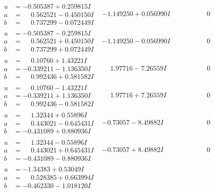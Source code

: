 \documentclass[1p]{elsarticle_modified}
\theoremstyle{definition}
\begin{document}
$$\begin{array}{c|c|c}
\begin{aligned}
u &= -0.505387 + 0.259815 I \\
a &= \phantom{-}0.562521 - 0.450150 I \\
b &= \phantom{-}0.737299 - 0.072449 I\end{aligned}
 & -1.149250 + 0.056990 I & \phantom{-0.000000 } 0 \\ \hline\begin{aligned}
u &= -0.505387 - 0.259815 I \\
a &= \phantom{-}0.562521 + 0.450150 I \\
b &= \phantom{-}0.737299 + 0.072449 I\end{aligned}
 & -1.149250 - 0.056990 I & \phantom{-0.000000 } 0 \\ \hline\begin{aligned}
u &= \phantom{-}0.10760 + 1.43221 I \\
a &= -0.339211 - 1.136350 I \\
b &= \phantom{-}0.992436 + 0.581582 I\end{aligned}
 & \phantom{-}1.97716 - 7.26559 I & \phantom{-0.000000 } 0 \\ \hline\begin{aligned}
u &= \phantom{-}0.10760 - 1.43221 I \\
a &= -0.339211 + 1.136350 I \\
b &= \phantom{-}0.992436 - 0.581582 I\end{aligned}
 & \phantom{-}1.97716 + 7.26559 I & \phantom{-0.000000 } 0 \\ \hline\begin{aligned}
u &= \phantom{-}1.32344 + 0.55896 I \\
a &= \phantom{-}0.443021 - 0.645431 I \\
b &= -0.431089 + 0.880936 I\end{aligned}
 & -0.73057 - 8.49882 I & \phantom{-0.000000 } 0 \\ \hline\begin{aligned}
u &= \phantom{-}1.32344 - 0.55896 I \\
a &= \phantom{-}0.443021 + 0.645431 I \\
b &= -0.431089 - 0.880936 I\end{aligned}
 & -0.73057 + 8.49882 I & \phantom{-0.000000 } 0 \\ \hline\begin{aligned}
u &= -1.34383 + 0.53049 I \\
a &= \phantom{-}0.528385 + 0.663994 I \\
b &= -0.462330 - 1.018120 I\end{aligned}

\end{array}$$
\end{document}
